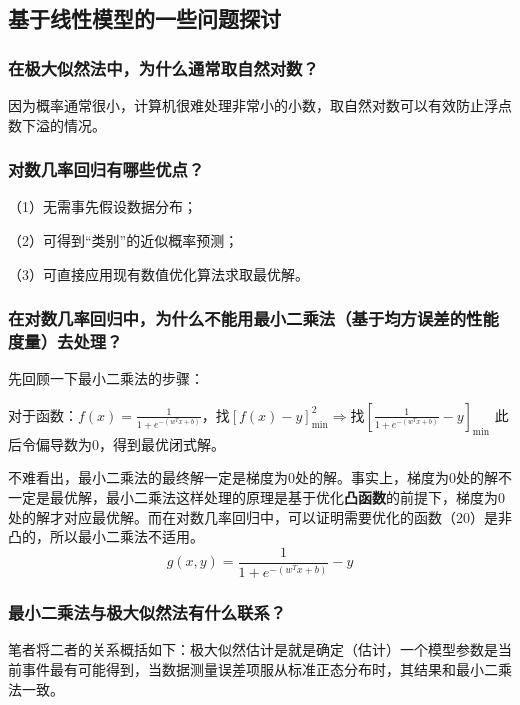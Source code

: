 \subsection{基于线性模型的一些问题探讨}
\subsubsection{在极大似然法中，为什么通常取自然对数？}
因为概率通常很小，计算机很难处理非常小的小数，取自然对数可以有效防止浮点数下溢的情况。
\subsubsection{对数几率回归有哪些优点？}
（1）无需事先假设数据分布；
\newline %
 
（2）可得到“类别”的近似概率预测；
\newline %

（3）可直接应用现有数值优化算法求取最优解。
\subsubsection{在对数几率回归中，为什么不能用最小二乘法（基于均方误差的性能度量）去处理？}
先回顾一下最小二乘法的步骤：

对于函数：$f(x)=\frac1{1+e^{-(w^Tx+b)}}$，找$[f(x)-y]^2_{\min}\Rightarrow\text{找}[\frac1{1+e^{-(w^Tx+b)}}-y]_{\min}$
此后令偏导数为0，得到最优闭式解。

不难看出，最小二乘法的最终解一定是梯度为0处的解。事实上，梯度为0处的解不一定是最优解，最小二乘法这样处理的原理是基于优化\textbf{凸函数}的前提下，梯度为0处的解才对应最优解。而在对数几率回归中，可以证明需要优化的函数（20）是非凸的，所以最小二乘法不适用。
\begin{equation}g(x,y)=\frac1{1+e^{-(w^Tx+b)}}-y\end{equation}
\subsubsection{最小二乘法与极大似然法有什么联系？}
笔者将二者的关系概括如下：极大似然估计是就是确定（估计）一个模型参数是当前事件最有可能得到，当数据测量误差项服从标准正态分布时，其结果和最小二乘法一致。
